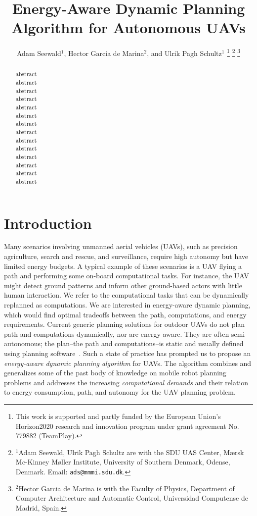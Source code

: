 \documentclass[letterpaper,10pt,conference]{ieeeconf}
\title{\LARGE \bf
Energy-Aware Dynamic Planning Algorithm for Autonomous UAVs
}
\author{
  Adam Seewald$^{1}$, Hector Garcia de Marina$^{2}$, and Ulrik Pagh Schultz$^{1}$
  \thanks{This work is supported and partly funded by the European Union's Horizon2020 research and innovation program under grant agreement No. 779882 (TeamPlay).
  }
  \thanks{$^{1}$Adam Seewald, Ulrik Pagh Schultz are with the SDU UAS Center, M{\ae}rsk Mc-Kinney M{\o}ller Institute, University of Southern Denmark, Odense, Denmark. Email: {\tt\small ads@mmmi.sdu.dk}.}
  \thanks{$^{2}$Hector Garcia de Marina is with the Faculty of Physics, Department of Computer Architecture and Automatic Control, Universidad Computense de Madrid, Spain.}
}
\theoremstyle{definition}
\begin{document}
\maketitle

\thispagestyle{empty}
\pagestyle{empty}

\begin{abstract}

  abstract\\
  abstract\\
  abstract\\
  abstract\\
  abstract\\
  abstract\\
  abstract\\
  abstract\\
  abstract\\
  abstract\\
  abstract\\
  abstract\\
  abstract\\
  abstract
\end{abstract}

%
\IEEEpeerreviewmaketitle


\section{Introduction}
\label{sec:intro}

Many scenarios involving unmanned aerial vehicles (UAVs), such as precision agriculture, search and rescue, and surveillance, require high autonomy but have limited energy budgets. A typical example of these scenarios is a UAV flying a path and performing some on-board computational tasks. For instance, the UAV might detect ground patterns and inform other ground-based actors with little human interaction. We refer to the computational tasks that can be dynamically replanned as computations. We are interested in energy-aware dynamic planning, which would find optimal tradeoffs between the path, computations, and energy requirements. Current generic planning solutions for outdoor UAVs do not plan path and computations dynamically, nor are energy-aware. They are often semi-autonomous; the plan--the path and computations--is static and usually defined using planning software~\cite{daponte2019review}. Such a state of practice has prompted us to propose an \emph{energy-aware dynamic planning algorithm} for UAVs. The algorithm combines and generalizes some of the past body of knowledge on mobile robot planning problems and addresses the increasing \emph{computational demands} and their relation to energy consumption, path, and autonomy for the UAV planning problem.
\end{document}
